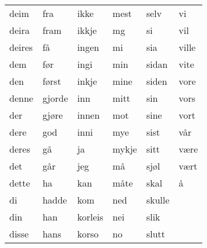 \begin{table}[htbp]
\begin{tabular}{l l l l l l}
    deim & fra & ikke & mest & selv & vi \\
    deira & fram & ikkje & mg & si & vil \\
    deires & få & ingen & mi & sia & ville \\
    dem & før & ingi & min & sidan & vite \\
    den & først & inkje & mine & siden & vore \\
    denne & gjorde & inn & mitt & sin & vors \\
    der & gjøre & innen & mot & sine & vort \\
    dere & god & inni & mye & sist & vår \\
    deres & gå & ja & mykje & sitt & være \\
    det & går & jeg & må & sjøl & vært \\
    dette & ha & kan & måte & skal & å \\
    di & hadde & kom & ned & skulle &  \\
    din & han & korleis & nei & slik &  \\
    disse & hans & korso & no & slutt &  \\
    \bottomrule
\end{tabular}
\end{table}